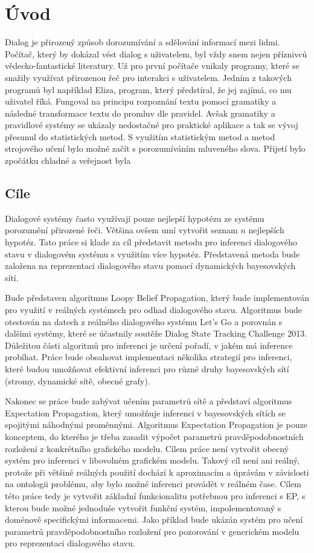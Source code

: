 \chapter*{Úvod}

Dialog je přirozený způsob dorozumívání a sdělování informací mezi lidmi.
Počítač, který by dokázal vést dialog s uživatelem, byl vždy snem nejen
příznivců vědecko-fantastické literatury.
Už pro první počítače vnikaly programy, které se snažily využívat přirozenou
řeč pro interakci s uživatelem.
Jedním z takových programů byl například Eliza, program, který předstíral, že
jej zajímá, co mu uživatel říká.
Fungoval na principu rozpoznání textu pomocí gramatiky a následné transformace
textu do promluv dle pravidel.
Avšak gramatiky a pravidlové systémy se ukázaly nedostačné pro praktické
aplikace a tak se vývoj přesunul do statistických metod.
S využitím statistickým metod a metod strojového učení bylo možné začít s
porozumíváním mluveného slova.
Přijetí bylo zpočátku chladné a veřejnost byla 

\section{Cíle}

Dialogové systémy často využívají pouze nejlepší hypotézu ze systému porozumění přirozené řeči.
Většina ovšem umí vytvořit seznam $n$ nejlepších hypotéz.
Tato práce si klade za cíl představit metodu pro inferenci dialogového stavu v dialogovém systému s využitím více hypotéz.
Představená metoda bude založena na reprezentaci dialogového stavu pomocí dynamických bayesovských sítí.

Bude představen algoritmus Loopy Belief Propagation, který bude implementován pro využití v reálných systémech pro odhad dialogového stavu.
Algoritmus bude otestován na datech z reálného dialogového systému Let's Go a porovnán s dalšími systémy, které se účastnily soutěže Dialog State Tracking Challenge 2013.
Důležitou části algoritmů pro inferenci je určení pořadí, v jakém má inference probíhat.
Práce bude obsahovat implementaci několika strategií pro inferenci, které budou umožňovat efektivní inferenci pro různé druhy bayesovských sítí (stromy, dynamické sítě, obecné grafy).

Nakonec se práce bude zabývat učením parametrů sítě a představí algoritmus Expectation Propagation, který umožňuje inferenci v bayesovských sítích se spojitými náhodnými proměnnými.
Algoritmus Expectation Propagation je pouze konceptem, do kterého je třeba zasadit výpočet parametrů pravděpodobnostních rozložení z konkrétního grafického modelu.
Cílem práce není vytvořit obecný systém pro inferenci v libovolném grafickém modelu.
Takový cíl není ani reálný, protože při většině reálných použití dochází k aproximacím a úprávám v závislosti na ontologii problému, aby bylo možné inferenci provádět v reálném čase.
Cílem této práce tedy je vytvořit základní funkcionalitu potřebnou pro inferenci s EP, s kterou bude možné jednoduše vytvořit funkční systém, impolementovaný s doménově specifickými informacemi.
Jako příklad bude ukázán systém pro učení parametrů pravděpodobnostního rozložení pro pozorování v generickém modelu pro reprezentaci dialogového stavu.
